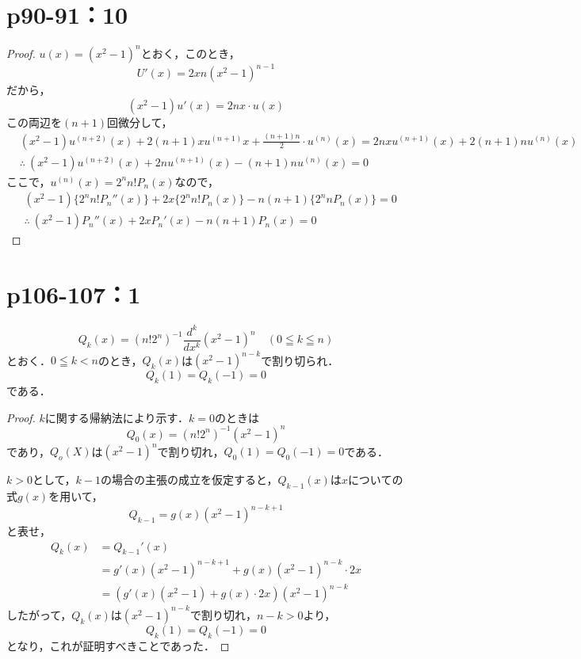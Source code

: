 \documentclass[a4paper,10pt,fleqn]{ltjsarticle}
\begin{document}
\section*{p90-91：10}

\begin{tleftbar}
    \begin{proof}
    $u(x)= (x^2-1)^n$とおく，このとき，
    \[
     U'(x)= 2x n(x^2-1)^{n-1}
    \]
    だから，
    \[
        (x^2-1) u'(x)=2nx \cdot u(x)
    \]
    この両辺を$(n+1)$回微分して，
    \begin{align*}
       & (x^2-1)u^{(n+2)}(x)+2(n+1)x u^{(n+1)} x + \frac{(n+1)n}{2} \cdot u^{(n)} (x) = 2nx u^{(n+1)}(x) + 2(n+1) n u^{(n)}(x) \\
       & \therefore ~(x^2-1)u^{(n+2)}(x) + 2n u^{(n+1)}(x)-(n+1)n u^{(n)}(x)=0
    \end{align*}
    ここで，$ u^{(n)} (x)= 2^n n! P_n (x)$なので，
    \begin{align*} 
        & (x^2 -1) \{ 2^n n! P_n ''(x) \} +2x \{ 2^n n! P_n (x) \} -n(n+1) \{ 2^n n P_n(x) \} =0 \\
      &   \therefore ~ (x^2-1) P_n ''(x)+2x P_n '(x) -n(n+1) P_n (x)=0
    \end{align*}
\end{proof}
\end{tleftbar}

\newpage 
\section*{p106-107：1}


    \[
        Q_k (x)= (n! 2^n)^{-1} \frac{d^k}{dx^k} (x^2-1)^n \quad (0 \leqq k \leqq n)
    \]
とおく．$0 \leqq k <n$のとき，$Q_k (x)$は$(x^2-1)^{n-k}$で割り切られ．
\[
    Q_k (1)= Q_k(-1)=0
\]
である．

\begin{proof}
    $k$に関する帰納法により示す．$k=0$のときは
    \[
        Q_0(x)= (n! 2^n)^{-1} (x^2-1)^n
    \]
    であり，$Q_o(X)$は$(x^2-1)^n$で割り切れ，$Q_0(1)=Q_0(-1)=0$である．

    $k>0$として，$k-1$の場合の主張の成立を仮定すると，$Q_{k-1}(x)$は$x$についての式$g(x)$を用いて，
    \[
        Q_{k-1} = g(x)(x^2-1)^{n-k+1}
    \]
    と表せ，
    \begin{align*}
        Q_k (x) & =Q_{k-1}' (x) \\
        &= g'(x)(x^2-1)^{n-k+1} + g(x) (x^2-1)^{n-k} \cdot 2x \\
        &=(g'(x)(x^2-1)+g(x) \cdot 2x) (x^2-1)^{n-k}
    \end{align*}
    したがって，$Q_k(x)$は$(x^2-1)^{n-k}$で割り切れ，$n-k >0$より，
    \[
        Q_k (1)= Q_k(-1)=0
    \]
    となり，これが証明すべきことであった．
\end{proof}
\end{document}
